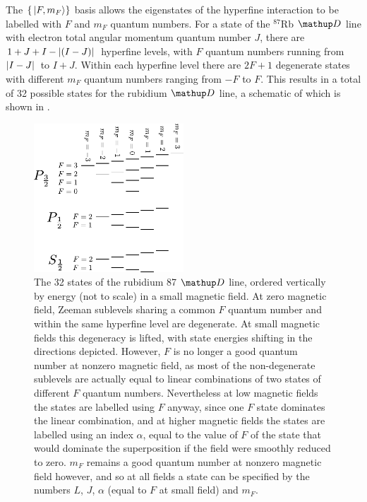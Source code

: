 The $\{\ket{F, m_F}\}$ basis allows the eigenstates of the hyperfine interaction to be labelled with $F$ and $m_F$ quantum numbers. For a state of the $^{87}$Rb $\up{D}$ line with electron total angular momentum quantum number $J$, there are $1+J+I - \abs{(I - J)}$ hyperfine levels, with $F$ quantum numbers running from $\abs{I - J}$ to $I + J$. Within each hyperfine level there are $2F + 1$ degenerate states with different $m_F$ quantum numbers ranging from $-F$ to $F$. This results in a total of 32 possible states for the rubidium $\up{D}$ line, a schematic of which is shown in .

\begin{figure}%
\begin{center}
\includegraphics[width=0.5\textwidth]{figures/atomic_physics/D_line.pdf}
\caption{The 32 states of the rubidium 87 $\up{D}$ line, ordered vertically by energy (not to scale) in a small magnetic field. At zero magnetic field, Zeeman sublevels sharing a common $F$ quantum number and within the same hyperfine level are degenerate. At small magnetic fields this degeneracy is lifted, with state energies shifting in the directions depicted. However, $F$ is no longer a good quantum number at nonzero magnetic field, as most of the non-degenerate sublevels are actually equal to linear combinations of two states of different $F$ quantum numbers. Nevertheless at low magnetic fields the states are labelled using $F$ anyway, since one $F$ state dominates the linear combination, and at higher magnetic fields the states are labelled using an index $\alpha$, equal to the value of $F$ of the state that would dominate the superposition if the field were smoothly reduced to zero. $m_F$ remains a good quantum number at nonzero magnetic field however, and so at all fields a state can be specified by the numbers $L$, $J$, $\alpha$ (equal to $F$ at small field) and $m_F$.} \label{fig:D_line}
\end{center}
\end{figure}

